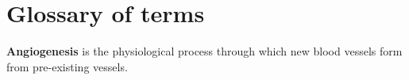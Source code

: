 \chapter{Glossary of terms}
\label{AppendixA}

\textbf{Angiogenesis} is the physiological process through which new blood vessels form from pre-existing vessels.

